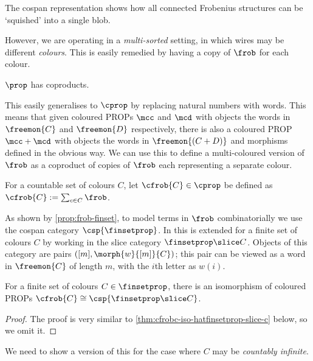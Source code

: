 The cospan representation shows how all connected Frobenius structures can be
`squished' into a single blob.

However, we are operating in a \emph{multi-sorted} setting, in which wires may
be different \emph{colours}.
This is easily remedied by having a copy of \(\frob\) for each colour.

\begin{theorem}
    \(\prop\) has coproducts.
\end{theorem}

This easily generalises to \(\cprop\) by replacing natural numbers with words.
This means that given coloured PROPs \(\mcc\) and \(\mcd\) with objects the
words in \(\freemon{C}\) and \(\freemon{D}\) respectively, there is also a
coloured PROP \(\mcc + \mcd\) with objects the words in \(\freemon{(C + D)}\)
and morphisms defined in the obvious way.
We can use this to define a multi-coloured version of \(\frob\) as
a coproduct of copies of \(\frob\) each representing a separate colour.

\begin{definition}
    \label{def:coloured-frob}
    For a countable set of colours \(C\), let \(\cfrob{C} \in \cprop\) be
    defined as \(\cfrob{C} := \sum_{c \in C}\frob\).
\end{definition}

As shown by \cref{prop:frob-finset}, to model terms in \(\frob\) combinatorially
we use the cospan category \(\csp{\finsetprop}\).
In \cite{bonchi2022string} this is extended for a finite set of colours \(C\) by
working in the slice category \(\finsetprop \slice C\).
Objects of this category are pairs \(([m], \morph{w}{[m]}{C})\); this pair can
be viewed as a word in \(\freemon{C}\) of length \(m\), with the \(i\)th letter
as \(w(i)\).

\begin{theorem}
    For a finite set of colours \(C \in \finsetprop\), there is an isomorphism
    of coloured PROPs \(\cfrob{C} \cong \csp{\finsetprop \slice C}\).
\end{theorem}
\begin{proof}
    The proof is very similar to \cref{thm:cfrobc-iso-hatfinsetprop-slice-c}
    below, so we omit it.
\end{proof}

We need to show a version of this for the case where \(C\) may be
\emph{countably infinite}.

